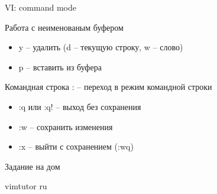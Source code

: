 \documentclass[ignorenonframetext, professionalfonts, hyperref={pdftex, unicode}]{beamer}
\begin{document}
\begin{frame}{VI: command mode}

	\begin{block}{Работа с неименованым буфером}
		\begin{itemize}
			\item y -- удалить (d -- текущую строку, w -- слово)
			\item p -- вставить из буфера
		\end{itemize}
	\end{block}

	\begin{block}{Командная строка}
		: -- переход в режим командной строки
		\begin{itemize}
			\item :q или :q! -- выход без сохранения
			\item :w -- сохранить изменения
			\item :x -- выйти с сохранением (:wq)
		\end{itemize}
	\end{block}
\end{frame}

\begin{frame}{Задание на дом}
\begin{block}{}
vimtutor ru
\end{block}
\end{frame}

%
%
\end{document}
